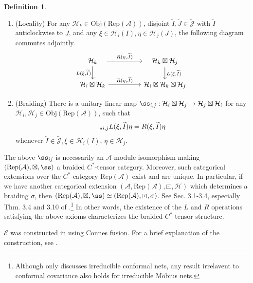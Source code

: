 \documentclass[11pt,b5paper,notitlepage]{article}
\theoremstyle{definition}
\newtheorem{df}{Definition}[section]
\theoremstyle{plain}
\newcommand{\mc}{\mathcal}
\newcommand{\wtd}{\widetilde}
\newcommand{\Rep}{\mathrm{Rep}}
\newcommand{\scr}{\mathscr}
\newcommand{\Jtd}{\widetilde{\mathcal J}}
\newcommand{\RepA}{\mathrm{Rep}(\mathcal A)}
\newcommand{\UPSU}{\widetilde{\mathrm{PSU}}(1,1)}
\newcommand{\Obj}{\mathrm{Obj}}
\numberwithin{equation}{section}
\begin{document}
\begin{df}
\begin{enumerate}[label=(\alph*)]
\item (Locality) For any $\mc H_k\in\Obj(\RepA)$, disjoint $\wtd I,\wtd J\in\Jtd$ with $\wtd I$ anticlockwise to $\wtd J$, and any $\xi\in\mc H_i(I),\eta\in\mc H_j(J)$, the following diagram commutes adjointly.
\begin{equation}
\begin{tikzcd}
\quad \mc H_k\quad \arrow[rr,"{R(\eta,\wtd J)}"] \arrow[d, "{L(\xi,\wtd I)}"'] &&\quad \mc H_k\boxtimes\mc H_j\quad \arrow[d, "{L(\xi,\wtd I)}"]\\
\mc H_i\boxtimes\mc H_k\arrow[rr,"{R(\eta,\wtd J)}"] &&\mc H_i\boxtimes\mc H_k\boxtimes\mc H_j
\end{tikzcd}
\end{equation}
\item (Braiding) There is a unitary linear map $\ss_{i,j}:\mc H_i\boxtimes\mc H_j\rightarrow\mc H_j\boxtimes \mc H_i$  for any $\mc H_i,\mc H_j\in\Obj(\RepA)$, such that  
\begin{align}
	\ss_{i,j} L(\xi,\wtd I)\eta=R(\xi,\wtd I)\eta\label{eq24}
\end{align}
whenever $\wtd I\in\Jtd,\xi\in\mc H_i(I)$, $\eta\in\mc H_j$.
\end{enumerate}
\end{df}

The above $\ss_{ij}$ is necessarily an $\mc A$-module isomorphism making $(\Rep(\mc A),\boxtimes,\ss)$ a braided $C^*$-tensor category. Moreover, such categorical extensions over the $C^*$-category $\RepA$ exist and are unique.  In particular, if we have another categorical extension $(\mc A,\RepA,\boxdot,\mc H)$ which determines a braiding $\sigma$, then $(\RepA,\boxtimes,\ss)\simeq(\RepA,\boxdot,\sigma)$. See Sec. 3.1-3.4, especially Thm. 3.4 and 3.10 of \cite{Gui21a}.\footnote{Although \cite{Gui21a} only discusses irreducible conformal nets, any result irrelavent to conformal covariance also holds for irreducible M\"obius nets. 
} In other words, the existence of the $L$ and $R$ operations satisfying the above axioms characterizes the braided $C^*$-tensor structure.


$\scr E$ was constructed in \cite{Gui21a} using Connes fusion. For a brief explanation of the construction, see \cite[Sec. A]{Gui21b}.
\end{document}
